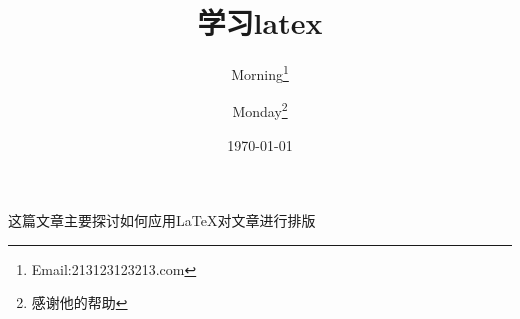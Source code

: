 \documentclass{article}
\title{学习latex}
\author{Morning\thanks{Email:213123123213.com} \and Monday\thanks{感谢他的帮助}}
\date{\today}
\begin{document}
\maketitle
这篇文章主要探讨如何应用LaTeX对文章进行排版
\end{document}
